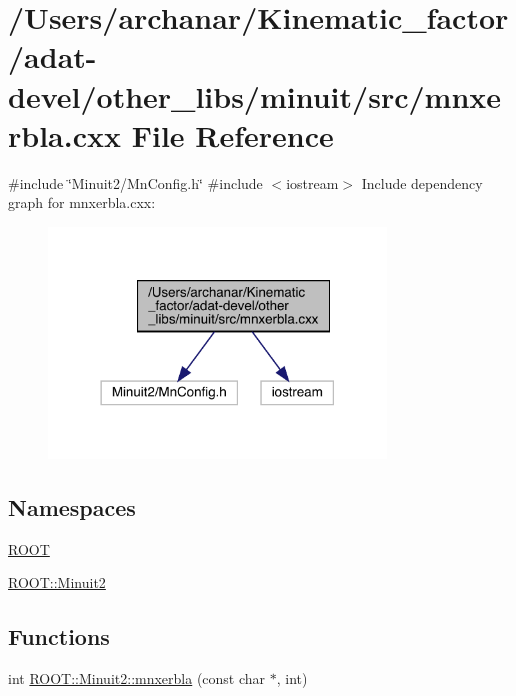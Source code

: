 \hypertarget{adat-devel_2other__libs_2minuit_2src_2mnxerbla_8cxx}{}\section{/\+Users/archanar/\+Kinematic\+\_\+factor/adat-\/devel/other\+\_\+libs/minuit/src/mnxerbla.cxx File Reference}
\label{adat-devel_2other__libs_2minuit_2src_2mnxerbla_8cxx}
{\ttfamily \#include \char`\"{}Minuit2/\+Mn\+Config.\+h\char`\"{}}\newline
{\ttfamily \#include $<$iostream$>$}\newline
Include dependency graph for mnxerbla.\+cxx\+:
\nopagebreak
\begin{figure}[H]
\begin{center}
\leavevmode
\includegraphics[width=254pt]{da/d80/adat-devel_2other__libs_2minuit_2src_2mnxerbla_8cxx__incl}
\end{center}
\end{figure}
\subsection*{Namespaces}
\begin{DoxyCompactItemize}
\item 
 \mbox{\hyperlink{namespaceROOT}{R\+O\+OT}}
\item 
 \mbox{\hyperlink{namespaceROOT_1_1Minuit2}{R\+O\+O\+T\+::\+Minuit2}}
\end{DoxyCompactItemize}
\subsection*{Functions}
\begin{DoxyCompactItemize}
\item 
int \mbox{\hyperlink{namespaceROOT_1_1Minuit2_a6c2d97c42f0b3f75b7370ae5e6f2c638}{R\+O\+O\+T\+::\+Minuit2\+::mnxerbla}} (const char $\ast$, int)
\end{DoxyCompactItemize}
